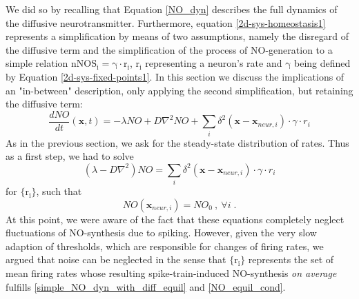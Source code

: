 \documentclass[10pt,a4paper]{article}
\begin{document}
We did so by recalling that Equation \eqref{NO_dyn} describes the full dynamics of the diffusive neurotransmitter. Furthermore, equation \eqref{2d-sys-homeostasis1} represents a simplification by means of two assumptions, namely the disregard of the diffusive term and the simplification of the process of NO-generation to a simple relation $\mathrm{nNOS_i = \gamma \cdot r_i}$, $\mathrm{r_i}$ representing a neuron's rate and $\mathrm{\gamma}$ being defined by Equation \eqref{2d-sys-fixed-points1}. In this section we discuss the implications of an "in-between" description, only applying the second simplification, but retaining the diffusive term:
\begin{equation}
\frac{dNO}{dt}(\mathbf{x},t) =-\lambda NO + D \nabla^2 NO + \sum_{i} \delta^2(\mathbf{x}-\mathbf{x}_{neur,i})\cdot \gamma \cdot r_i
\label{simple_NO_dyn_with_diff}
\end{equation}
As in the previous section, we ask for the steady-state distribution of rates. Thus as a first step, we had to solve
\begin{equation}
(\lambda - D \nabla^2) NO = \sum_{i} \delta^2(\mathbf{x}-\mathbf{x}_{neur,i})\cdot \gamma \cdot r_i
\label{simple_NO_dyn_with_diff_equil}
\end{equation}
for $\mathrm{\lbrace r_i\rbrace}$, such that
\begin{equation}
NO(\mathbf{x}_{neur,i}) = NO_0 \:, \: \forall i \; .
\label{NO_equil_cond}
\end{equation}
At this point, we were aware of the fact that these equations completely neglect fluctuations of NO-synthesis due to spiking. However, given the very slow adaption of thresholds, which are responsible for changes of firing rates, we argued that noise can be neglected in the sense that $\mathrm{\lbrace r_i\rbrace}$ represents the set of mean firing rates whose resulting spike-train-induced NO-synthesis \emph{on average} fulfills \eqref{simple_NO_dyn_with_diff_equil} and \eqref{NO_equil_cond}.
  
\end{document}
